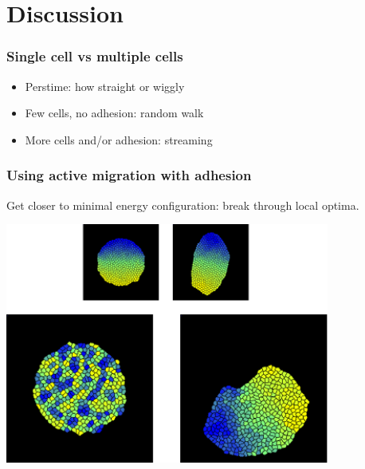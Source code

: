 \documentclass[compress]{beamer}
\begin{document}
 \section{Discussion}

\begin{frame}
\frametitle{Single cell vs multiple cells}
\begin{itemize}
 \item Perstime: how straight or wiggly
 \item Few cells, no adhesion: random walk
 \item More cells and/or adhesion: streaming
\end{itemize}

\end{frame}


\begin{frame}
\frametitle{Using active migration with adhesion}
Get closer to minimal energy configuration: break through local optima.
\begin{center}
 \includegraphics[width=0.8\textwidth]{figures/gradedadhesion2.pdf}\\
\end{center}
\end{frame}
\end{document}
